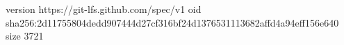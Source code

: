 version https://git-lfs.github.com/spec/v1
oid sha256:2d11755804dedd907444d27cf316bf24d1376531113682affd4a94eff156e640
size 3721
